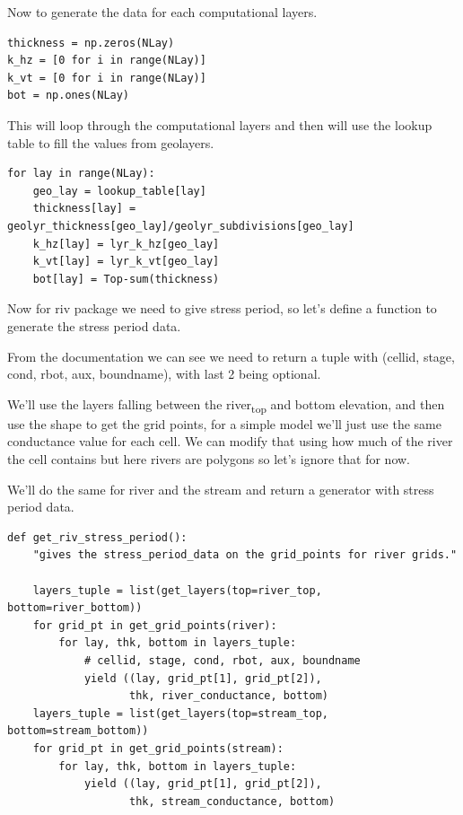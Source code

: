 \documentclass[titlepage,12pt]{unisubmission}
\begin{document}
Now to generate the data for each computational layers.
\begin{verbatim}
thickness = np.zeros(NLay)
k_hz = [0 for i in range(NLay)]
k_vt = [0 for i in range(NLay)]
bot = np.ones(NLay)
\end{verbatim}

This will loop through the computational layers and then will use the lookup table to fill the values from geolayers.

\begin{verbatim}
for lay in range(NLay):
    geo_lay = lookup_table[lay]
    thickness[lay] = geolyr_thickness[geo_lay]/geolyr_subdivisions[geo_lay]
    k_hz[lay] = lyr_k_hz[geo_lay]
    k_vt[lay] = lyr_k_vt[geo_lay]
    bot[lay] = Top-sum(thickness)
\end{verbatim}

Now for riv package we need to give stress period, so let's define a function to generate the stress period data.

From the documentation we can see we need to return a tuple with (cellid, stage, cond, rbot, aux, boundname), with last 2 being optional.

We'll use the layers falling between the river\textsubscript{top} and bottom elevation, and then use the shape to get the grid points, for a simple model we'll just use the same conductance value for each cell. We can modify that using how much of the river the cell contains but here rivers are polygons so let's ignore that for now.

We'll do the same for river and the stream and return a generator with stress period data.

\begin{verbatim}
def get_riv_stress_period():
    "gives the stress_period_data on the grid_points for river grids."

    layers_tuple = list(get_layers(top=river_top, bottom=river_bottom))
    for grid_pt in get_grid_points(river):
        for lay, thk, bottom in layers_tuple:
            # cellid, stage, cond, rbot, aux, boundname
            yield ((lay, grid_pt[1], grid_pt[2]),
                   thk, river_conductance, bottom)
    layers_tuple = list(get_layers(top=stream_top, bottom=stream_bottom))
    for grid_pt in get_grid_points(stream):
        for lay, thk, bottom in layers_tuple:
            yield ((lay, grid_pt[1], grid_pt[2]),
                   thk, stream_conductance, bottom)
\end{verbatim}
\end{document}
